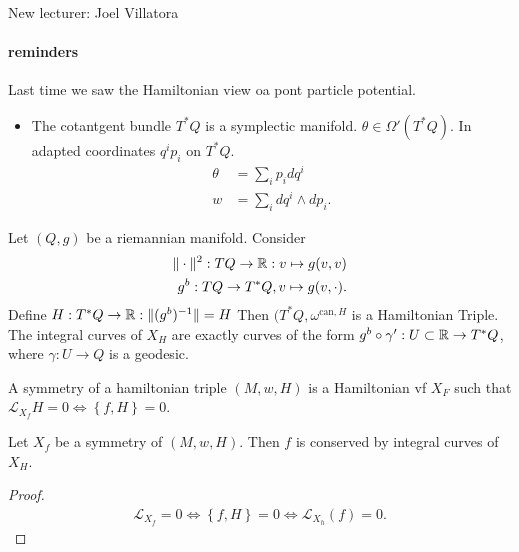 
New lecturer: Joel Villatora

\paragraph{reminders}
Last time we saw the Hamiltonian view oa pont particle potential.

\begin{itemize}
	\item The cotantgent bundle $T^* Q$ is a symplectic manifold. $\theta \in \Omega'(T^*Q)$.
		In adapted coordinates   $q^{i}p_i$ on $T^*Q$. 
		\begin{align*}
			\theta &=  \sum_{i} p_i dq^{i} \\
			w &= \sum_{i}dq^{i} \wedge d p_i
		.\end{align*}
\end{itemize}
\begin{example}
	[2.5.7]	
	Let $(Q, g)$ be a riemannian manifold.
	Consider \begin{align*}
		\|\cdot \|^2: TQ \to \mathbb{R}: v \mapsto  g(v,v)\\
		g^{b}: TQ \to T^*Q, v\mapsto g(v, \cdot )
	.\end{align*} 
	Define $H:T^*Q \to \mathbb{R}: \|(g^{b})^{-1}\| = H$
	Then $(T^*Q, \omega^{\text{can}, H}$ is a Hamiltonian Triple.
	The integral curves of $X_H$ are exactly curves of the form $g^{b} \circ \gamma': U \subset \mathbb{R} \to T^*Q$, where $\gamma: U \to Q$ is a geodesic.
\end{example}
\begin{definition}
	A symmetry of a hamiltonian triple $(M, w, H)$  is a Hamiltonian vf $X_F$ such that $\mathcal{L} _{X_f}H = 0 \iff \left\{ f, H \right\}  = 0$.
\end{definition}
\begin{theorem}
	[Noether]
	Let $X_f$ be a symmetry of $(M, w, H)$. Then $f$ is conserved by integral curves of $X_H$. 
\end{theorem}
\begin{proof}
	\begin{align*}
		\mathcal{L} _{X_f} = 0 \iff \left\{ f, H \right\}  = 0 \iff \mathcal{L} _{X_h}(f) = 0
	.\end{align*}
\end{proof}

